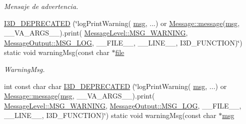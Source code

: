 \begin{DoxyCompactItemize}
\begin{DoxyCompactList}\small\item\em Mensaje de advertencia. \end{DoxyCompactList}\item 
\hyperlink{class_i3_d_1_1_log_msg_ab1a5c89d91dadcb74e6af6928957ca59}{I3\+D\+\_\+\+D\+E\+P\+R\+E\+C\+A\+T\+ED} (\char`\"{}log\+Print\+Warning( \hyperlink{class_i3_d_1_1_log_msg_a5a1ceb27d9529de8eb9b3fc9377e178a}{msg}, ...) or \hyperlink{class_i3_d_1_1_message_a525f877a41a1e7493188b2b720d1d254}{Message\+::message}(\hyperlink{class_i3_d_1_1_log_msg_a5a1ceb27d9529de8eb9b3fc9377e178a}{msg}, \+\_\+\+\_\+\+V\+A\+\_\+\+A\+R\+G\+S\+\_\+\+\_\+).print( \hyperlink{namespace_i3_d_a1c1740d2076e09b1a37b82e45a0327b5a124799373c019c5c7480f21a24104688}{Message\+Level\+::\+M\+S\+G\+\_\+\+W\+A\+R\+N\+I\+NG}, \hyperlink{namespace_i3_d_a2ccb65ac6e08844c1175a235107fa103a8c1a4761ebfadb227927517230ff7b02}{Message\+Output\+::\+M\+S\+G\+\_\+\+L\+OG}, \+\_\+\+\_\+\+F\+I\+L\+E\+\_\+\+\_\+, \+\_\+\+\_\+\+L\+I\+N\+E\+\_\+\+\_\+, I3\+D\+\_\+\+F\+U\+N\+C\+T\+I\+ON)\char`\"{}) static void warning\+Msg(const char $\ast$\hyperlink{class_i3_d_1_1_log_msg_ab59f20d39ef112d2196371ae0636d77c}{file}
\begin{DoxyCompactList}\small\item\em Warning\+Msg. \end{DoxyCompactList}\item 
int const char char \hyperlink{class_i3_d_1_1_log_msg_ab787c621ae0393e9fd5bdec3b2ebc02c}{I3\+D\+\_\+\+D\+E\+P\+R\+E\+C\+A\+T\+ED} (\char`\"{}log\+Print\+Warning( \hyperlink{class_i3_d_1_1_log_msg_a5a1ceb27d9529de8eb9b3fc9377e178a}{msg}, ...) or \hyperlink{class_i3_d_1_1_message_a525f877a41a1e7493188b2b720d1d254}{Message\+::message}(\hyperlink{class_i3_d_1_1_log_msg_a5a1ceb27d9529de8eb9b3fc9377e178a}{msg}, \+\_\+\+\_\+\+V\+A\+\_\+\+A\+R\+G\+S\+\_\+\+\_\+).print( \hyperlink{namespace_i3_d_a1c1740d2076e09b1a37b82e45a0327b5a124799373c019c5c7480f21a24104688}{Message\+Level\+::\+M\+S\+G\+\_\+\+W\+A\+R\+N\+I\+NG}, \hyperlink{namespace_i3_d_a2ccb65ac6e08844c1175a235107fa103a8c1a4761ebfadb227927517230ff7b02}{Message\+Output\+::\+M\+S\+G\+\_\+\+L\+OG}, \+\_\+\+\_\+\+F\+I\+L\+E\+\_\+\+\_\+, \+\_\+\+\_\+\+L\+I\+N\+E\+\_\+\+\_\+, I3\+D\+\_\+\+F\+U\+N\+C\+T\+I\+ON)\char`\"{}) static void warning\+Msg(const char $\ast$\hyperlink{class_i3_d_1_1_log_msg_a5a1ceb27d9529de8eb9b3fc9377e178a}{msg}
\item 

\end{DoxyCompactItemize}
